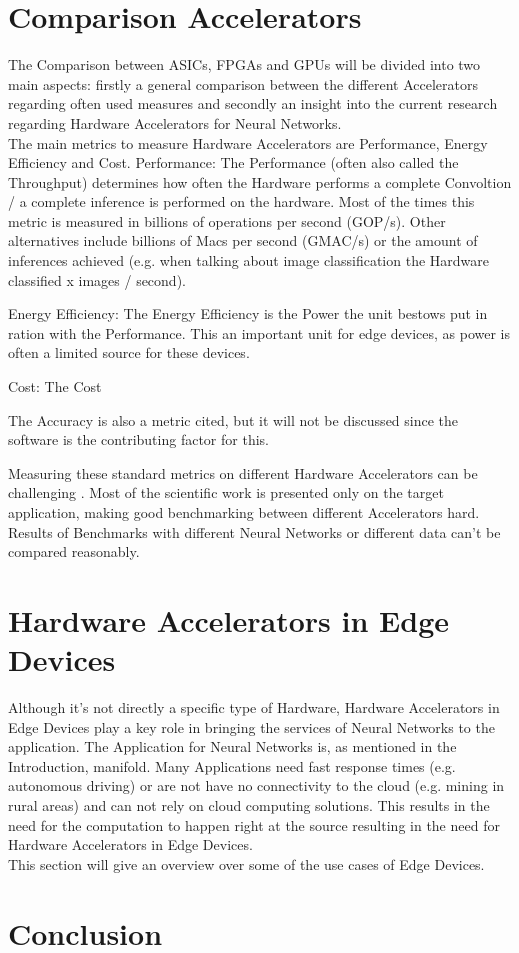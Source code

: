 \documentclass[conference]{IEEEtran}
\begin{document}
\section{Comparison Accelerators}
The Comparison between ASICs, FPGAs and GPUs will be divided into two main aspects: firstly a general comparison between the different Accelerators regarding often used measures and secondly an insight into the current research regarding Hardware Accelerators for Neural Networks.
\\
The main metrics to measure Hardware Accelerators are Performance, Energy Efficiency and Cost.
Performance:
The Performance (often also called the Throughput) determines how often the Hardware performs a complete Convoltion / a complete inference is performed on the hardware. Most of the times this metric is measured in billions of operations per second (GOP/s). Other alternatives include billions of Macs per second (GMAC/s) or the amount of inferences achieved (e.g. when talking about image classification the Hardware classified x images / second). 

Energy Efficiency:
The Energy Efficiency is the Power the unit bestows put in ration with the Performance. This an important unit for edge devices, as power is often a limited source for these devices.

Cost: The Cost 

The Accuracy is also a metric cited, but it will not be discussed since the software is the contributing factor for this.

Measuring these standard metrics on different Hardware Accelerators can be challenging \cite{capra2020updated}. Most of the scientific work is presented only on the target application, making good benchmarking between different Accelerators hard. Results of Benchmarks with different Neural Networks or different data can't be compared reasonably.




\section{Hardware Accelerators in Edge Devices}
Although it's not directly a specific type of Hardware, Hardware Accelerators in Edge Devices play a key role in bringing the services of Neural Networks to the application. The Application for Neural Networks is, as mentioned in the Introduction, manifold. Many Applications need fast response times (e.g. autonomous driving) or are not have no connectivity to the cloud (e.g. mining in rural areas) and can not rely on cloud computing solutions. This results in the need for the computation to happen right at the source resulting in the need for Hardware Accelerators in Edge Devices.
\\
This section will give an overview over some of the use cases of Edge Devices.






\section{Conclusion}

\newpage
\quad
\newpage


\end{document}
